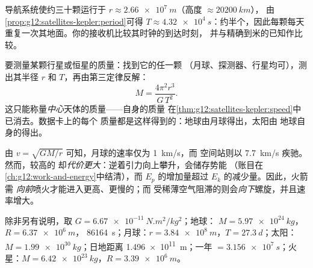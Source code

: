 \begin{example}[卫星导航星座]\label{ex:g12:satellites-kepler:gps}
导航系统使约三十颗运行于
$r \approx \qty{2.66e7}{m}$（高度 $\approx \qty{20200}{km}$），
由\cref{prop:g12:satellites-kepler:period}可得 $T \approx
\qty{4.32e4}{s}$：约半个，因此每颗每天
重复一次其地面。你的接收机比较其时钟的到达时刻，
并与精确到米的已知作比较。
\end{example}

\begin{method}[由卫星称量天体的质量]\label{met:g12:satellites-kepler:weigh}
%
要测量某颗行星或恒星的质量：找到它的任一颗
（月球、探测器、行星均可），测出其半径 $r$ 和
$T$，再由第三定律反解：
\[ M = \frac{4\pi^2 r^3}{G\,T^2}. \]
这只能称量\emph{中心}天体的质量——自身的质量
在\cref{thm:g12:satellites-kepler:speed}中已消去。数据卡上的每个
质量都是这样得到的：地球由月球得出，太阳由
地球自身的得出。
\end{method}

\begin{remark}\label{rem:g12:satellites-kepler:energy}
由 $v = \sqrt{GM/r}$ 可知，月球的速率仅为 \qty{1}{km/s}，而
空间站则以 \qty{7.7}{km/s} 疾驰。然而，较高的
却\emph{代价更大}：逆着引力向上攀升，会储存势能
（账目在\cref{ch:g12:work-and-energy}中结清），而
$E_p$ 的增加量超过 $E_k$ 的减少量。因此，火箭需
\emph{向前}喷火才能进入更高、更慢的；而
受稀薄空气阻滞的则会\emph{向下}螺旋，并且速率增大。
\end{remark}

\begin{remark}[数据卡]\label{rem:g12:satellites-kepler:data}
除非另有说明，取 $G = \qty{6.67e-11}{N.m^2/kg^2}$；地球：
$M = \qty{5.97e24}{kg}$，$R = \qty{6.37e6}{m}$，
\qty{86164}{s}；月球：$r = \qty{3.84e8}{m}$，$T =
\qty{27.3}{d}$；太阳：$M = \qty{1.99e30}{kg}$；日地距离
\qty{1.496e11}{m}；一年 $= \qty{3.156e7}{s}$；火星：$M =
\qty{6.42e23}{kg}$，$R = \qty{3.39e6}{m}$。
\end{remark}

